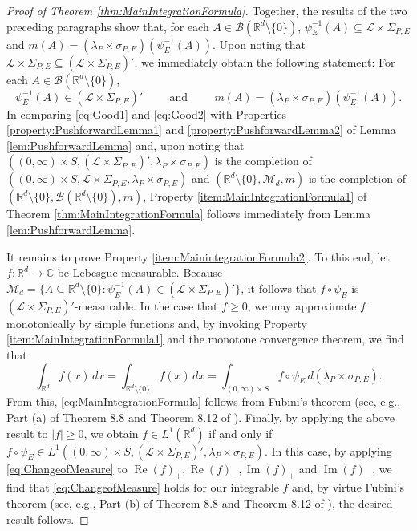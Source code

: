 \documentclass[11pt, letter]{book}
\renewcommand\Re{\operatorname{Re}}%
\renewcommand\Im{\operatorname{Im}}
\begin{document}
\begin{proof}[Proof of Theorem \ref{thm:MainIntegrationFormula}]
Together, the results of the two preceding paragraphs show that, for each $A\in\mathcal{B}(\mathbb{R}^d\setminus\{0\})$, $\psi_E^{-1}(A)\subseteq \mathcal{L}\times\Sigma_{P,E}$ and $m(A)=(\lambda_P\times\sigma_{P,E})(\psi_E^{-1}(A))$. Upon noting that $\mathcal{L}\times\Sigma_{P,E}\subseteq (\mathcal{L}\times\Sigma_{P,E})'$, we immediately obtain the following statement: For each $A\in\mathcal{B}(\mathbb{R}^d\setminus\{0\})$,
\begin{equation}\label{eq:Good2}
\psi_E^{-1}(A)\in (\mathcal{L}\times\Sigma_{P,E})'\hspace{1cm}\mbox{and}\hspace{1cm}m(A)=(\lambda_P\times\sigma_{P,E})(\psi_E^{-1}(A)).
\end{equation}
In comparing \eqref{eq:Good1} and \eqref{eq:Good2} with Properties \ref{property:PushforwardLemma1} and \ref{property:PushforwardLemma2} of Lemma \ref{lem:PushforwardLemma} and, upon noting that $((0,\infty)\times S,(\mathcal{L}\times\Sigma_{P,E})',\lambda_P\times\sigma_{P,E})$ is the completion of $((0,\infty)\times S,\mathcal{L}\times\Sigma_{P,E},\lambda_P\times\sigma_{P,E})$ and $(\mathbb{R}^d\setminus\{0\},\mathcal{M}_d,m)$ is the completion of $(\mathbb{R}^d\setminus\{0\},\mathcal{B}(\mathbb{R}^d\setminus\{0\}),m)$, Property \ref{item:MainIntegrationFormula1} of Theorem \ref{thm:MainIntegrationFormula} follows immediately from Lemma \ref{lem:PushforwardLemma}.

It remains to prove Property \ref{item:MainintegrationFormula2}. To this end, let $f:\mathbb{R}^d\to\mathbb{C}$ be Lebesgue measurable. Because $\mathcal{M}_d=\{A\subseteq \mathbb{R}^d\setminus\{0\}:\psi_E^{-1}(A)\in(\mathcal{L}\times\Sigma_{P,E})'\}$, it follows that $f\circ\psi_E$ is $(\mathcal{L}\times\Sigma_{P,E})'$-measurable. In the case that $f\geq 0$, we may approximate $f$ monotonically by simple functions and, by invoking Property \ref{item:MainIntegrationFormula1} and the monotone convergence theorem, we find that
\begin{equation}\label{eq:ChangeofMeasure}
\int_{\mathbb{R}^d}f(x)\,dx=\int_{\mathbb{R}^d\setminus \{0\}}f(x)\,dx=\int_{(0,\infty)\times S}f\circ \psi_E\, d(\lambda_P\times\sigma_{P,E}).
\end{equation}
From this, \eqref{eq:MainIntegrationFormula} follows from Fubini's theorem (see, e.g., Part (a) of Theorem 8.8 and Theorem 8.12 of \cite{rudin_real_1987}). Finally, by applying the above result to $|f|\geq 0$, we obtain $f\in L^1(\mathbb{R}^d)$ if and only if $f\circ \psi_E\in L^1((0,\infty)\times S,(\mathcal{L}\times\Sigma_{P,E})',\lambda_P\times\sigma_{P,E})$. In this case, by applying \eqref{eq:ChangeofMeasure} to $\Re(f)_+,\Re(f)_-,\Im(f)_+$ and $\Im(f)_-$, we find that \eqref{eq:ChangeofMeasure} holds for our integrable $f$ and, by virtue Fubini's theorem (see, e.g., Part (b) of Theorem 8.8 and Theorem 8.12 of \cite{rudin_real_1987}), the desired result follows.
\end{proof}
\end{document}
